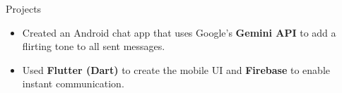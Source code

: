 \documentclass{resume} %
\begin{document}
\begin{workSection}{Projects}



	\customItem[
	title=\href{https://github.com/AshkanArabim/flirtify}{Flirtify \faExternalLink},
	duration=Solo | December 2024 - January 2025,
	]
	\begin{itemize}
		\vspace{-0.5em}
		\itemsep -6pt {}
		\item Created an Android chat app that uses Google's \textbf{Gemini API} to add a flirting tone to all sent messages.
		\item Used \textbf{Flutter (Dart)} to create the mobile UI and \textbf{Firebase} to enable instant communication.
	\end{itemize}


\end{workSection}
\end{document}

